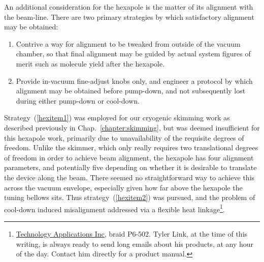 An additional consideration for the hexapole is the matter of its alignment with the beam-line.
There are two primary strategies by which satisfactory alignment may be obtained:
\begin{enumerate}
\item Contrive a way for alignment to be tweaked from outside of the vacuum chamber, so that final alignment may be guided by actual system figures of merit such as molecule yield after the hexapole. \label{hexitem1}
\item Provide in-vacuum fine-adjust knobs only, and engineer a protocol by which alignment may be obtained before pump-down, and not subsequently lost during either pump-down or cool-down. \label{hexitem2}
\end{enumerate}
Strategy~(\ref{hexitem1}) was employed for our cryogenic skimming work as described previously in Chap.~\ref{chapter:skimming}, but was deemed insufficient for this hexapole work, primarily due to unavailability of the requisite degrees of freedom.
Unlike the skimmer, which only really requires two translational degrees of freedom in order to achieve beam alignment, the hexapole has four alignment parameters, and potentially five depending on whether it is desirable to translate the device along the beam.
There seemed no straightforward way to achieve this across the vacuum envelope, especially given how far above the hexapole the tuning bellows sits.
Thus strategy~(\ref{hexitem2}) was pursued, and the problem of cool-down induced misalignment addressed via a flexible heat linkage\footnote{\href{https://www.techapps.com/}{Technology Applications Inc,} braid P6-502. Tyler Link, at the time of this writing, is always ready to send long emails about his products, at any hour of the day. Contact him directly for a product manual.}\!\!.

